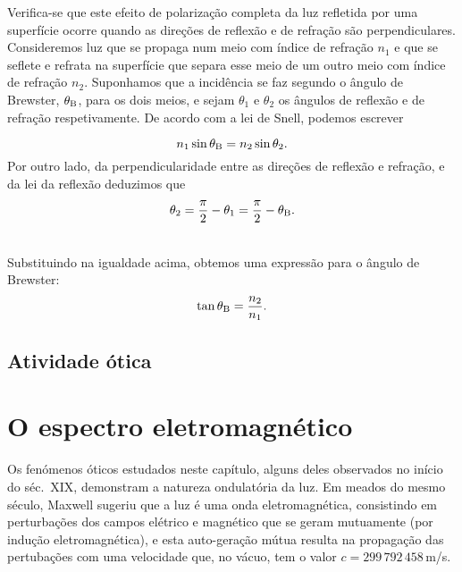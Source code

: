Verifica-se que este efeito de polarização completa da luz refletida por uma
superfície ocorre quando as direções de reflexão e de refração são
perpendiculares. Consideremos luz que se propaga num meio com índice de refração
$n_1$ e que se seflete e refrata na superfície que separa esse meio de um outro
meio com índice de refração $n_2$. Suponhamos que a incidência se faz segundo o
ângulo de Brewster, $\theta_\text B$, para os dois meios, e sejam $\theta_1$ e
$\theta_2$ os ângulos de reflexão e de refração respetivamente.
De acordo com a lei de Snell, podemos escrever
\begin{minipage}[t]{0.80\linewidth}
\begin{equation*}
    n_1\sin\theta_\text B=n_2\sin\theta_2.
\end{equation*}
Por outro lado, da perpendicularidade entre as direções de reflexão e refração,
e da lei da reflexão deduzimos que
\begin{equation*}
    \theta_2=\frac{\pi}{2}-\theta_1=\frac{\pi}{2}-\theta_\text B.
\end{equation*}
\end{minipage}
\hfill
{}\\[2mm]
Substituindo na igualdade acima, obtemos uma expressão para o ângulo de
Brewster:
\begin{equation*}
    \tan\theta_\text B = \frac{n_2}{n_1}.
\end{equation*}

\subsection{Atividade ótica}
\tobedone

\section{O espectro eletromagnético}
Os fenómenos óticos estudados neste capítulo, alguns deles observados no início
do séc.~XIX, demonstram a natureza ondulatória da luz. Em meados do mesmo
século, Maxwell sugeriu que a luz é uma onda eletromagnética, consistindo em
perturbações dos campos elétrico e magnético que se geram mutuamente (por
indução eletromagnética), e esta auto-geração mútua resulta na propagação das
pertubações com uma velocidade que, no vácuo, tem o valor
$c=299\,792\,458$\,m/s.

